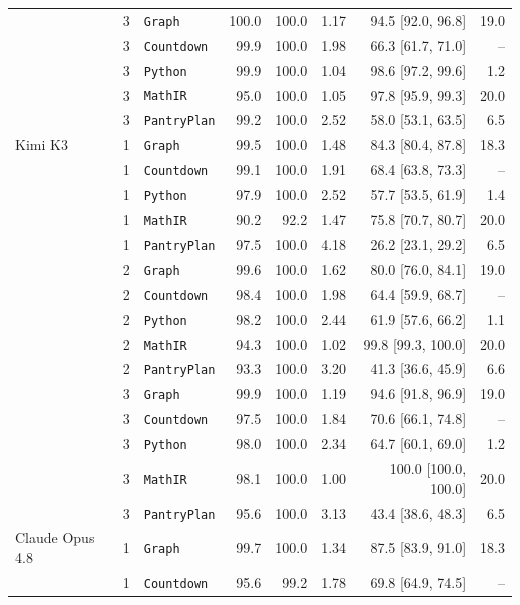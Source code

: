 \begin{longtable}{@{}lrlrrrrr@{}}
     & 3 & \texttt{Graph} & 100.0 & 100.0 & 1.17 & 94.5 [92.0, 96.8] & 19.0 \\
     & 3 & \texttt{Countdown} & 99.9 & 100.0 & 1.98 & 66.3 [61.7, 71.0] & -- \\
     & 3 & \texttt{Python} & 99.9 & 100.0 & 1.04 & 98.6 [97.2, 99.6] & 1.2 \\
     & 3 & \texttt{MathIR} & 95.0 & 100.0 & 1.05 & 97.8 [95.9, 99.3] & 20.0 \\
     & 3 & \texttt{PantryPlan} & 99.2 & 100.0 & 2.52 & 58.0 [53.1, 63.5] & 6.5 \\
    \addlinespace[2pt]
    Kimi K3 & 1 & \texttt{Graph} & 99.5 & 100.0 & 1.48 & 84.3 [80.4, 87.8] & 18.3 \\
     & 1 & \texttt{Countdown} & 99.1 & 100.0 & 1.91 & 68.4 [63.8, 73.3] & -- \\
     & 1 & \texttt{Python} & 97.9 & 100.0 & 2.52 & 57.7 [53.5, 61.9] & 1.4 \\
     & 1 & \texttt{MathIR} & 90.2 & 92.2 & 1.47 & 75.8 [70.7, 80.7] & 20.0 \\
     & 1 & \texttt{PantryPlan} & 97.5 & 100.0 & 4.18 & 26.2 [23.1, 29.2] & 6.5 \\
     & 2 & \texttt{Graph} & 99.6 & 100.0 & 1.62 & 80.0 [76.0, 84.1] & 19.0 \\
     & 2 & \texttt{Countdown} & 98.4 & 100.0 & 1.98 & 64.4 [59.9, 68.7] & -- \\
     & 2 & \texttt{Python} & 98.2 & 100.0 & 2.44 & 61.9 [57.6, 66.2] & 1.1 \\
     & 2 & \texttt{MathIR} & 94.3 & 100.0 & 1.02 & 99.8 [99.3, 100.0] & 20.0 \\
     & 2 & \texttt{PantryPlan} & 93.3 & 100.0 & 3.20 & 41.3 [36.6, 45.9] & 6.6 \\
     & 3 & \texttt{Graph} & 99.9 & 100.0 & 1.19 & 94.6 [91.8, 96.9] & 19.0 \\
     & 3 & \texttt{Countdown} & 97.5 & 100.0 & 1.84 & 70.6 [66.1, 74.8] & -- \\
     & 3 & \texttt{Python} & 98.0 & 100.0 & 2.34 & 64.7 [60.1, 69.0] & 1.2 \\
     & 3 & \texttt{MathIR} & 98.1 & 100.0 & 1.00 & 100.0 [100.0, 100.0] & 20.0 \\
     & 3 & \texttt{PantryPlan} & 95.6 & 100.0 & 3.13 & 43.4 [38.6, 48.3] & 6.5 \\
    \addlinespace[2pt]
    Claude Opus 4.8 & 1 & \texttt{Graph} & 99.7 & 100.0 & 1.34 & 87.5 [83.9, 91.0] & 18.3 \\
     & 1 & \texttt{Countdown} & 95.6 & 99.2 & 1.78 & 69.8 [64.9, 74.5] & -- \\

\end{longtable}
